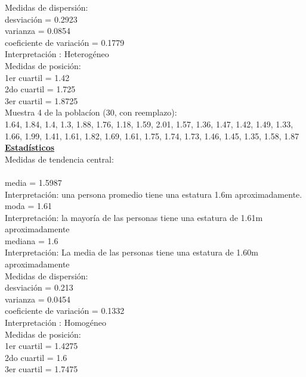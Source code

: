 \documentclass[a4paper,12pt]{article}
\begin{document}
\begin{enumerate}
Medidas de dispersi\'on:\\
desviaci\'on = 0.2923\\
varianza =  0.0854\\
coeficiente de variaci\'on = 0.1779\\
Interpretaci\'on : Heterog\'eneo\\

Medidas de posici\'on:\\
1er cuartil = 1.42\\
2do cuartil = 1.725\\
3er cuartil = 1.8725\\

Muestra 4 de la poblac\'ion (30, con reemplazo): \\

1.64,	1.84,	1.4,    1.3,    1.88,	1.76,
1.18,	1.59,	2.01,	1.57,	1.36,	1.47,
1.42,	1.49,	1.33,	1.66,	1.99,	1.41,
1.61,	1.82,	1.69,	1.61,	1.75,	1.74,
1.73,	1.46,	1.45,	1.35,	1.58,	1.87\\

\textbf{\underline{Estad\'isticos}} \\

Medidas de tendencia central:\\\\
media =  1.5987\\
Interpretaci\'on: una persona promedio tiene una estatura 1.6m aproximadamente.\\
moda =  1.61\\
Interpretaci\'on: la mayor\'ia de las personas tiene una estatura de 1.61m aproximadamente\\
mediana =  1.6\\
Interpretaci\'on: La media de las personas tiene una estatura de 1.60m aproximadamente\\

Medidas de dispersi\'on:\\
desviaci\'on = 0.213\\
varianza = 0.0454\\
coeficiente de variaci\'on = 0.1332\\
Interpretaci\'on : Homog\'eneo\\

Medidas de posici\'on:\\
1er cuartil = 1.4275\\
2do cuartil = 1.6\\
3er cuartil = 1.7475\\


\end{enumerate}
\end{document}
